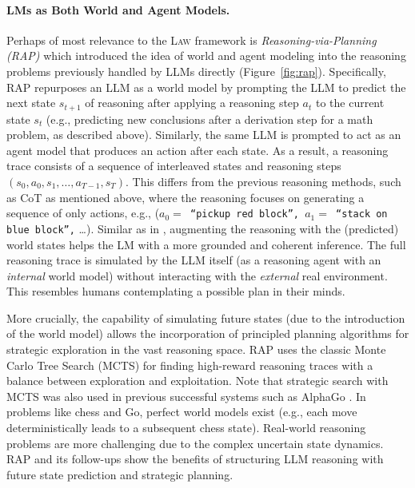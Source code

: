 \documentclass{article}
\def\modelname{\textsc{Law}\xspace}
\begin{document}
\paragraph{LMs as Both World and Agent Models.} 
Perhaps of most relevance to the \modelname framework is {\it Reasoning-via-Planning (RAP)} \citep{hao2023reasoning} which introduced the idea of world and agent modeling into the reasoning problems previously handled by LLMs directly (Figure~\ref{fig:rap}). Specifically, RAP repurposes an LLM as a world model by prompting the LLM to predict the next state $s_{t+1}$ of reasoning after applying a reasoning step $a_t$ to the current state $s_t$ (e.g., predicting new conclusions after a derivation step for a math problem, as described above). Similarly, the same LLM is prompted to act as an agent model that produces an action after each state. As a result, a reasoning trace consists of a sequence of interleaved states and reasoning steps $(s_0, a_0, s_1, \dots, a_{T-1}, s_T)$. This differs from the previous reasoning methods, such as CoT as mentioned above, where the reasoning focuses on generating a sequence of only actions, e.g., (\texttt{$a_0=$ ``pickup red block'', $a_1=$ ``stack on blue block'',} \dots). Similar as in \citep{li2022language}, augmenting the reasoning with the (predicted) world states helps the LM with a more grounded and coherent inference. The full reasoning trace is simulated by the LLM itself (as a reasoning agent with an {\it internal} world model) without interacting with the {\it external} real environment. This resembles humans contemplating a possible plan in their minds.

More crucially, the capability of simulating future states (due to the introduction of the world model) allows the incorporation of principled planning algorithms for strategic exploration in the vast reasoning space. RAP uses the classic Monte Carlo Tree Search (MCTS) \citep{kocsis2006bandit, coulom2007efficient} for finding high-reward reasoning traces with a balance between exploration and exploitation. Note that strategic search with MCTS was also used in previous successful systems such as AlphaGo \citep{silver2016mastering}. In problems like chess and Go, perfect world models exist (e.g., each move deterministically leads to a subsequent chess state). Real-world reasoning problems are more challenging due to the complex uncertain state dynamics. RAP and its follow-ups \citep[e.g.,][]{wang2023promptagent} show the benefits of structuring LLM reasoning with future state prediction and strategic planning.
\end{document}
